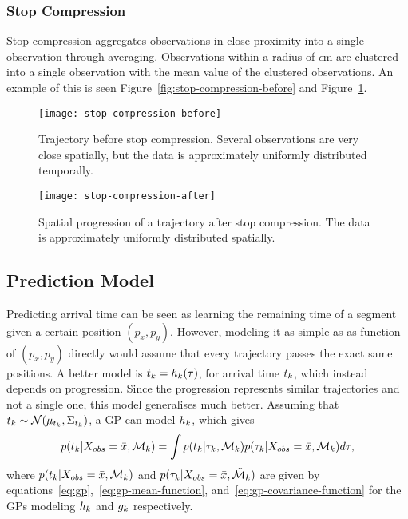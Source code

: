 \subsubsection{Stop Compression}
\label{sec:stop-compression}
Stop compression aggregates observations in close proximity into a
single observation through averaging. Observations within a radius of
$\epsilon$m are clustered into a single observation with the mean value of
the clustered observations. An example of this is seen
Figure~\ref{fig:stop-compression-before} and Figure~\ref{fig:stop-compression-after}.
\begin{figure}
  \begin{minipage}{.46\textwidth}
    \texttt{[image: stop-compression-before]}
    \caption{Trajectory before stop compression. Several observations
      are very close spatially, but the data is
      approximately uniformly distributed temporally. }\label{fig:stop-compression-before}
  \end{minipage}
  \hspace{5pt}
  \begin{minipage}{.46\textwidth}
    \texttt{[image: stop-compression-after]}
    \caption{Spatial progression of a trajectory
      after stop compression. The data is
      approximately uniformly distributed spatially.}\label{fig:stop-compression-after}
  \end{minipage}
\end{figure}

\subsection{Prediction Model}
Predicting arrival time can be seen as learning the remaining time of
a segment given a certain position $(p_x, p_y)$. However, modeling it
as simple as as function of $(p_x, p_y)$ directly would assume that 
every trajectory passes the exact same positions. A better model is $t_{k}
= h_{k}(\tau)$, for arrival time $t_{k}$, 
which instead depends on progression. Since the
progression represents similar trajectories and not a single one, this
model generalises much better. Assuming that $t_{k} \sim
\mathcal{N}(\mu_{t_{k}}, \Sigma_{t_{k}})$, a GP can model
$h_{k}$, which gives
\begin{equation}
  \label{eq:arrival-time-probability}
  p(t_{k} \vert X_{obs} = \bar{x}, \mathcal{M}_k) 
  = \int p(t_{k} \vert \tau_{k},
  \mathcal{M}_{k}) p(\tau_{k} \vert X_{obs} 
  = \bar{x}, \mathcal{M}_{k}) d\tau,
\end{equation}
where $p(t_{k} \vert X_{obs} = \bar{x}, \mathcal{M}_k)$ 
and $p(\tau_{k} \vert X_{obs} = \bar{x},
\tilde{\mathcal{M}}_{k})$ are given by equations~\ref{eq:gp},~\ref{eq:gp-mean-function},
and~\ref{eq:gp-covariance-function} for the GPs modeling
$h_{k}$ and $g_{k}$ respectively.

